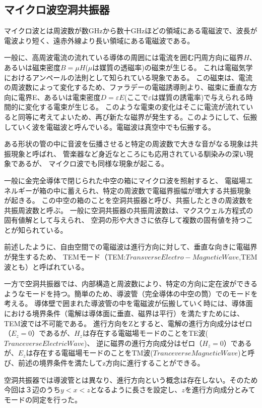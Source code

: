\subsection*{マイクロ波空洞共振器}
マイクロ波とは周波数が数GHzから数十GHzほどの領域にある電磁波で、波長が電波より短く、遠赤外線より長い領域にある電磁波である。

一般に、高周波電流の流れている導体の周囲には電流を囲む円周方向に磁界$H$、あるいは磁束密度$B =μH$($μ$は媒質の透磁率)の磁束が生じる。
これは電磁気学におけるアンペールの法則として知られている現象である。
この磁束は、電流の周波数によって変化するため、ファラデーの電磁誘導則より、磁束に垂直な方向に電界E、あるいは電束密度$D =εE$(ここで$ε$は媒質の誘電率)で与えられる時間的に変化する電束が生じる。
このような電束の変化はそこに電流が流れていると同等に考えてよいため、再び新たな磁界が発生する。このようにして、伝搬していく波を電磁波と呼んでいる。電磁波は真空中でも伝搬する。

ある形状の管の中に音波を伝播させると特定の周波数で大きな音がなる現象は共振現象と呼ばれ、
管楽器など身近なところにも応用されている馴染みの深い現象であるが、
マイクロ波でも同様な現象が起こる。

一般に金完全導体で閉じられた中空の箱にマイクロ波を照射すると、
電磁場エネルギーが箱の中に蓄えられ、特定の周波数で電磁界振幅が増大する共振現象が起きる。
この中空の箱のことを空洞共振器と呼び、共振したときの周波数を共振周波数と呼ぶ。
一般に空洞共振器の共振周波数は、マクスウェル方程式の固有値解として与えられ、
空洞の形や大きさに依存して複数の固有値を持つことが知られている。

前述したように、自由空間での電磁波は進行方向に対して、垂直な向きに電磁界が発生するため、
TEMモード（TEM:$Transverse Electro-Magnetic Wave$,TEM波とも）と呼ばれている。

一方で空洞共振器では、内部構造と周波数により、特定の方向に定在波ができるようなモードを持つ。簡単のため、導波管（完全導体の中空の筒）でのモードを考える。
導体壁で囲まれた導波管の中を電磁波が伝搬していく時には、導体面における境界条件（電解は導体面に垂直、磁界は平行）を満たすためには、TEM波では不可能である。
進行方向をZとすると、電解の進行方向成分はゼロ（$E_z = 0$）であるが、$H_z$は存在する電磁場モードのことをTE波($Tranceverse Electric Wave$)、
逆に磁界の進行方向成分はゼロ（$H_z=0$）であるが、$E_z$は存在する電磁場モードのことをTM波($Tranceverse Magnetic Wave$)と呼び、前述の境界条件を満たしてz方向に進行することができる。

空洞共振器では導波管とは異なり、進行方向という概念は存在しない。そのため今回は３辺のうち$y<x<z$となるように長さを設定し、$z$を進行方向成分とみてモードの同定を行った。


